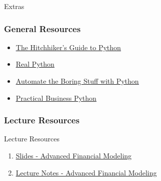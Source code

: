 \documentclass[handout, 11pt]{beamer}
\begin{document}
\begin{section}{Extras}
\begin{frame}
\frametitle{General Resources}
\begin{itemize}
\item \textcolor{blue}{\underline{\href{https://docs.python-guide.org/}{The Hitchhiker's Guide to Python}}}
\vfill
\item \textcolor{blue}{\underline{\href{https://realpython.com/}{Real Python}}}
\vfill
\item \textcolor{blue}{\underline{\href{https://automatetheboringstuff.com/}{Automate the Boring Stuff with Python}}}
\vfill
\item \textcolor{blue}{\underline{\href{https://pbpython.com/}{Practical Business Python}}}
\end{itemize}
\end{frame}
\end{section}
\appendix
{}
\setcounter{finalframe}{\value{framenumber}}
\begin{frame}
\frametitle{Lecture Resources}
{
\begin{block}{Lecture Resources}
\begin{enumerate}
\item \textcolor{blue}{\underline{\href{https://nickderobertis.github.io/fin-model-course/\_static/generated/pdfs/SA1 Advanced Financial Modeling.pdf}{Slides - Advanced Financial Modeling}}}
\item \textcolor{blue}{\underline{\href{https://nickderobertis.github.io/fin-model-course/\_static/generated/pdfs/LNA1 Advanced Financial Modeling.pdf}{Lecture Notes - Advanced Financial Modeling}}}
\end{enumerate}
\vfill
\end{block}
}
\label{frames:resources}
\end{frame}
\setcounter{framenumber}{\value{finalframe}}
\end{document}
